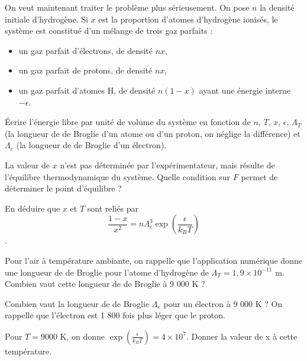 \documentclass[utf8, 11pt]{feuille}
\begin{document}
On veut maintenant traiter le problème plus sérieusement. On pose $n$ la densité initiale d’hydrogène. Si $x$ est la proportion d’atomes d’hydrogène ionisés, le système est constitué d’un mélange de trois gaz parfaits :
\begin{itemize}
    \item un gaz parfait d’électrons, de densité $nx$,
    \item un gaz parfait de protons, de densité $nx$,
    \item un gaz parfait d’atomes H, de densité $n(1 - x)$ ayant une énergie interne $-\epsilon$.
\end{itemize}


\question Écrire l’énergie libre par unité de volume du système en fonction de $n$, $T$, $x$, $\epsilon$, $\Lambda_T$ (la longueur de de Broglie d’un atome ou d’un proton, on néglige la différence) et  $\Lambda_e$ (la longueur de de Broglie d’un électron).

\question La valeur de $x$ n’est pas déterminée par l’expérimentateur, mais résulte de l’équilibre thermodynamique du système. Quelle condition sur $F$ permet de déterminer le point d’équilibre ?

\question  En déduire que $x$ et $T$ sont reliés par $$\frac{1-x}{x^2}=n\Lambda_e^3 \exp(\frac{\epsilon}{k_BT})$$.

\question Pour l’air à température ambiante, on rappelle que l’application numérique donne une longueur de de Broglie pour l'atome d'hydrogène de  $ \Lambda_T=1,9 \times 10^{-11}$ m. Combien vaut cette longueur de de Broglie à 9 000 K  ?

\question  Combien vaut la longueur de de Broglie $\Lambda_e$ pour un électron à 9 000 K ? On rappelle que l’électron est 1 800 fois plus léger que le proton.

\question Pour $T = 9 000$ K, on donne  $\exp(\frac{\epsilon}{k_BT})=4 \times 10^7$. Donner la valeur de x à cette température.
\end{document}
